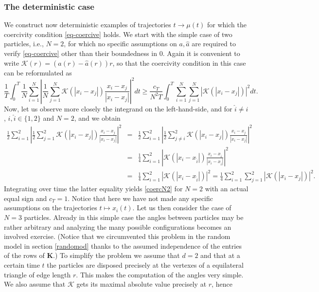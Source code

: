 \subsubsection{The deterministic case}
We construct now  deterministic examples of trajectories $t \to \mu(t)$ for which the  coercivity condition \eqref{eq-coercive} holds.
We start with the simple case of two particles, i.e., $N=2$, for which no specific assumptions on $a,\widehat a$ are required to verify \eqref{eq-coercive} other than their boundedness in $0$. Again it is convenient to write $\mathcal K(r) = (a(r) - \widehat a(r)) r$, so that the coercivity condition in this case can be reformulated as 
\begin{equation}\label{coercN2}
\frac{1}{T} \int_0^T \frac{1}{N} \sum_{i=1}^N \left | \frac{1}{N} \sum_{j=1}^N \mathcal K(|x_i-x_j|) \frac{x_i-x_j}{|x_i-x_j|} \right |^2 dt \geq \frac{c_T}{N^2T} \int_0^T  \sum_{i=1}^N \sum_{j=1}^N |\mathcal K(|x_i-x_j|)|^2  dt.
\end{equation}
Now, let us observe more closely the integrand on the left-hand-side, and for $\widehat i \neq i$, $i,  \widehat i \in \{1,2\}$ and $N=2$, and we obtain
\begin{eqnarray*}
\frac{1}{2} \sum_{i=1}^2 \left | \frac{1}{2} \sum_{j=1}^2 \mathcal K(|x_i-x_j|) \frac{x_i-x_j}{|x_i-x_j|} \right |^2 &=& \frac{1}{2} \sum_{i=1}^2 \left | \frac{1}{2} \sum_{j\neq i}^2 \mathcal K(|x_i-x_j|) \frac{x_i-x_j}{|x_i-x_j|} \right |^2 \\
&=&  \frac{1}{4} \sum_{i=1}^2 \left |  \mathcal K(|x_i-x_{\widehat i}|) \frac{x_i-x_{\widehat i}}{|x_i-x_{\widehat i}|} \right |^2\\
&=& \frac{1}{4} \sum_{i=1}^2 \left |  \mathcal K(|x_i-x_{\widehat i}|) \right |^2=\frac{1}{4}  \sum_{i=1}^2 \sum_{j=1}^2 |\mathcal K(|x_i-x_j|)|^2.
\end{eqnarray*}
Integrating over time the latter equality yields \eqref{coercN2} for $N=2$ with an actual equal sign and $c_T=1$. Notice that here we have not made any specific assumptions on the trajectories $t \mapsto x_i(t)$. 
Let us then consider the case of $N=3$ particles. Already in this simple case the angles between particles may be rather arbitrary and analyzing the many possible configurations becomes an involved exercise. (Notice that we circumvented this problem in the random model in section \ref{randomod} thanks to the assumed independence of the entries of the rows of $\mathbf K$.)
To simplify the problem we assume that $d=2$  and that at a certain time $t$ the particles are disposed precisely at the vertexes of a equilateral triangle of edge length $r$. This makes the computation of the angles very simple. We also assume that $\mathcal K$ gets its maximal absolute value precisely at $r$, hence
